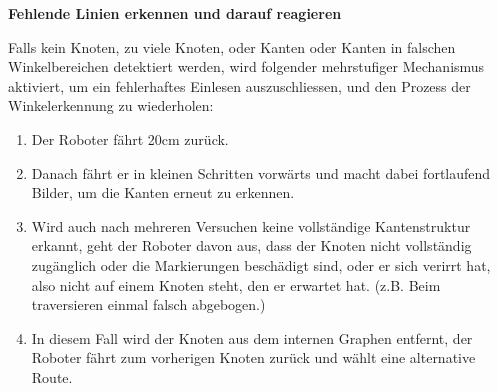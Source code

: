 \textbf{Fehlende Linien erkennen und darauf reagieren}

Falls kein Knoten, zu viele Knoten, oder Kanten oder Kanten in falschen Winkelbereichen detektiert werden, wird folgender mehrstufiger Mechanismus aktiviert, um ein fehlerhaftes Einlesen auszuschliessen, und den Prozess der Winkelerkennung zu wiederholen:
\begin{enumerate}
    \item Der Roboter fährt 20cm zurück.
    \item Danach fährt er in kleinen Schritten vorwärts und macht dabei fortlaufend Bilder, um die Kanten erneut zu erkennen.
    \item Wird auch nach mehreren Versuchen keine vollständige Kantenstruktur erkannt, geht der Roboter davon aus, dass der Knoten nicht vollständig zugänglich oder die Markierungen beschädigt sind, oder er sich verirrt hat, also nicht auf einem Knoten steht, den er erwartet hat. (z.B. Beim traversieren einmal falsch abgebogen.)
    \item In diesem Fall wird der Knoten aus dem internen Graphen entfernt, der Roboter fährt zum vorherigen Knoten zurück und wählt eine alternative Route.
\end{enumerate}
